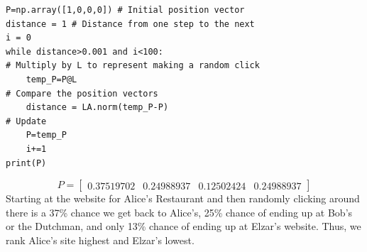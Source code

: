 \begin{exposition}
\begin{verbatim}
P=np.array([1,0,0,0]) # Initial position vector
distance = 1 # Distance from one step to the next
i = 0
while distance>0.001 and i<100:
# Multiply by L to represent making a random click
    temp_P=P@L
# Compare the position vectors
    distance = LA.norm(temp_P-P)
# Update
    P=temp_P
    i+=1
print(P)
\end{verbatim}
\begin{equation*}
    P=\begin{bmatrix}
        0.37519702 & 0.24988937 & 0.12502424 & 0.24988937
    \end{bmatrix}    
\end{equation*}
Starting at the website for Alice's Restaurant and then randomly clicking around there is a 37\% chance we get back to Alice's, 25\% chance of ending up at Bob's or the Dutchman, and only  13\% chance of ending up at Elzar's website. Thus, we rank Alice's site highest and Elzar's lowest.

    
\end{exposition}

